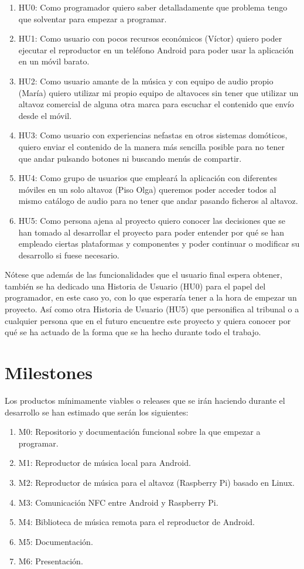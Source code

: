 \begin{enumerate}
    \item HU0: Como programador quiero saber detalladamente que problema tengo que solventar para empezar a programar.
    \item HU1: Como usuario con pocos recursos económicos (Víctor) quiero poder ejecutar el reproductor en un teléfono Android para poder usar la aplicación en un móvil barato.
    \item HU2: Como usuario amante de la música y con equipo de audio propio (María) quiero utilizar mi propio equipo de altavoces sin tener que utilizar un altavoz comercial de alguna otra marca para escuchar el contenido que envío desde el móvil.
    \item HU3: Como usuario con experiencias nefastas en otros sistemas domóticos, quiero enviar el contenido de la manera más sencilla posible para no tener que andar pulsando botones ni buscando menús de compartir.
    \item HU4: Como grupo de usuarios que empleará la aplicación con diferentes móviles en un solo altavoz (Piso Olga) queremos poder acceder todos al mismo catálogo de audio para no tener que andar pasando ficheros al altavoz.
    \item HU5: Como persona ajena al proyecto quiero conocer las decisiones que se han tomado al desarrollar el proyecto para poder entender por qué se han empleado ciertas plataformas y componentes y poder continuar o modificar su desarrollo si fuese necesario.
\end{enumerate}

Nótese que además de las funcionalidades que el usuario final espera obtener, también se ha dedicado una Historia de Usuario (HU0) para el papel del programador, en este caso yo, con lo que esperaría tener a la hora de empezar un proyecto.
Así como otra Historia de Usuario (HU5) que personifica al tribunal o a cualquier persona que en el futuro encuentre este proyecto y quiera conocer por qué se ha actuado de la forma que se ha hecho durante todo el trabajo.

\section{Milestones}
Los productos mínimamente viables o releases que se irán haciendo durante el desarrollo se han estimado que serán los siguientes:

\begin{enumerate}
    \item M0: Repositorio y documentación funcional sobre la que empezar a programar.
    \item M1: Reproductor de música local para Android.
    \item M2: Reproductor de música para el altavoz (Raspberry Pi) basado en Linux.
    \item M3: Comunicación NFC entre Android y Raspberry Pi.
    \item M4: Biblioteca de música remota para el reproductor de Android.
    \item M5: Documentación.
    \item M6: Presentación.
\end{enumerate}